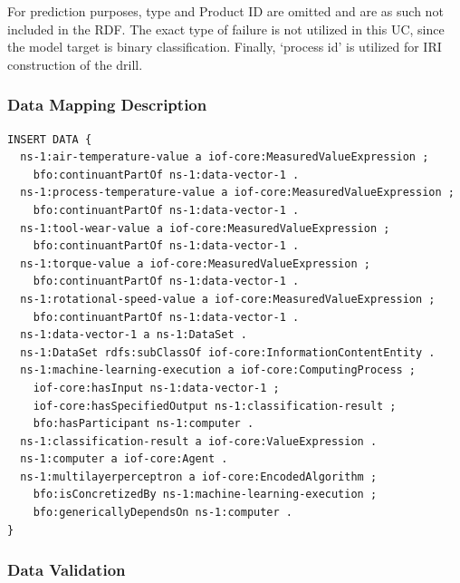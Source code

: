 For prediction purposes, type and Product ID are omitted and are as such not included in the RDF. The exact type of failure is not utilized in this UC, since the model target is binary classification. Finally, `process id' is utilized for IRI construction of the drill.

\subsubsection*{Data Mapping Description}

\begin{verbatim}
INSERT DATA {
  ns-1:air-temperature-value a iof-core:MeasuredValueExpression ;
    bfo:continuantPartOf ns-1:data-vector-1 .
  ns-1:process-temperature-value a iof-core:MeasuredValueExpression ;
    bfo:continuantPartOf ns-1:data-vector-1 .
  ns-1:tool-wear-value a iof-core:MeasuredValueExpression ;
    bfo:continuantPartOf ns-1:data-vector-1 .
  ns-1:torque-value a iof-core:MeasuredValueExpression ;
    bfo:continuantPartOf ns-1:data-vector-1 .
  ns-1:rotational-speed-value a iof-core:MeasuredValueExpression ;
    bfo:continuantPartOf ns-1:data-vector-1 .
  ns-1:data-vector-1 a ns-1:DataSet .
  ns-1:DataSet rdfs:subClassOf iof-core:InformationContentEntity .
  ns-1:machine-learning-execution a iof-core:ComputingProcess ;
    iof-core:hasInput ns-1:data-vector-1 ;
    iof-core:hasSpecifiedOutput ns-1:classification-result ;
    bfo:hasParticipant ns-1:computer .
  ns-1:classification-result a iof-core:ValueExpression .
  ns-1:computer a iof-core:Agent .
  ns-1:multilayerperceptron a iof-core:EncodedAlgorithm ;
    bfo:isConcretizedBy ns-1:machine-learning-execution ;
    bfo:genericallyDependsOn ns-1:computer .
}
\end{verbatim}

\subsubsection*{Data Validation}